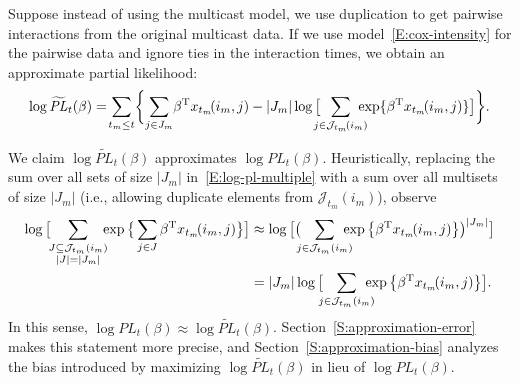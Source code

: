\documentclass[final]{statsoc}
\begin{document}
Suppose instead of using the multicast model, we use duplication to get
pairwise interactions from the original multicast data.  If we use
model~\eqref{E:cox-intensity} for the pairwise data and ignore ties in
the interaction times, we obtain an approximate partial likelihood:
\begin{equation}\label{E:log-pl-multiple-approx}
    \log
    \widetilde{\mathit{PL}}_t(\beta)
        =\!
        \sum_{t_m \leq t}\!
        \bigg\{\!
            \sum_{j \in J_m}\!
                \beta^\trans x_{t_m}\!(i_m, j)
            -
            |J_m|
            \log\big[
                \!\!\!\!
                \sum_{j \in \mathcal{J}_{t_m}\!(i_m)}\!\!\!\!\!
                    \exp\{ \beta^\trans x_{t_m}\!(i_m, j)\}
            \big]
        \bigg\}.
\end{equation}

We claim $\log \widetilde{\mathit{PL}}_t(\beta)$ approximates
$\log \mathit{PL}_t(\beta)$.  Heuristically, replacing the
sum over all sets of size $|J_m|$ in~\eqref{E:log-pl-multiple}
with a sum over all multisets of size $|J_m|$ (i.e., allowing
duplicate elements from $\mathcal{J}_{t_m}(i_m)$), observe
\begin{align*}
    \log\big[\!\!
        \sum_{\substack{J \subseteq \mathcal{J}_{t_m}(i_m) \\
              |J| = |J_m|}}\!\!\!
            \exp\big\{
                \sum_{j \in J}
                    \beta^\trans x_{t_m}\!(i_m, j)
            \big\}
    \big]
    &\approx
        \log\big[
            \big(\!\!\!
            \sum_{j \in \mathcal{J}_{t_m}(i_m)}\!\!\!\!\!
                \exp\big\{
                    \beta^\trans x_{t_m}\!(i_m, j)
                \big\}
        \big)^{|J_m|}
        \big] \\
    &=
        |J_m|
        \log\big[\!\!\!
            \sum_{j \in \mathcal{J}_{t_m}(i_m)}\!\!\!\!\!
                \exp\big\{
                    \beta^\trans x_{t_m}\!(i_m, j)
                \big\}
        \big].
\end{align*}
In this sense,
$\log \mathit{PL}_t(\beta) \approx \log \widetilde{\mathit{PL}}_t(\beta)$.
Section~\ref{S:approximation-error} makes this statement more precise,
and Section~\ref{S:approximation-bias} analyzes the bias introduced by
maximizing $\log \widetilde{\mathit{PL}}_t(\beta)$ in lieu of
$\log \mathit{PL}_t(\beta)$.
\end{document}
